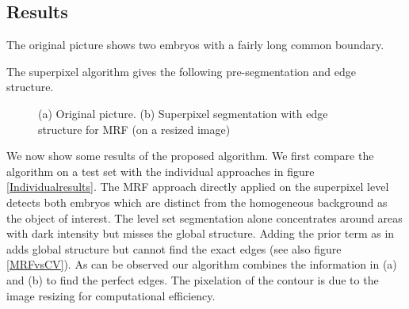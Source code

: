 \documentclass{article} %
\begin{document}
\subsection{Results}
The original picture shows two embryos with a fairly long common boundary. 

The superpixel algorithm gives the following pre-segmentation and edge structure.

 \begin{figure}[htbp]
  \centering
\caption{(a) Original picture. (b) Superpixel segmentation with edge structure for MRF (on a resized image)}
\label{Superpixels}
 \end{figure}

We now show some results of the proposed algorithm. We first compare the algorithm on a test set with the individual approaches in figure \eqref{Individualresults}. The MRF approach directly applied on the superpixel level detects both embryos which are distinct from the homogeneous background as the object of interest. The level set segmentation alone concentrates around areas with dark intensity but misses the global structure. Adding the prior term as in \cite{Cremers06_KernelDensity} adds global structure but cannot find the exact edges (see also figure \ref{MRFvsCV}). As can be observed our algorithm combines the information in (a) and (b) to find the perfect edges. The pixelation of the contour is due to the image resizing for computational efficiency.
\end{document}
